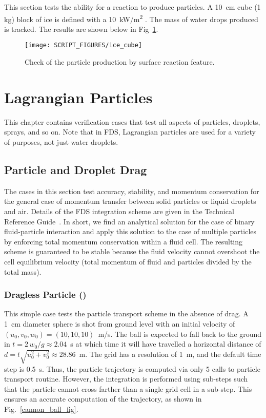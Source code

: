 \documentclass[11pt]{book}
\begin{document}
This section tests the ability for a  reaction to produce particles. A 10~cm cube (1 kg) block of ice is defined with a 10~\si{kW/m^2} . The mass of water drops produced is tracked. The results are shown below in Fig~\ref{fig:ice_cube}.

\begin{figure}[!ht]
    \centering
    \texttt{[image: SCRIPT\_FIGURES/ice\_cube]}
    \caption[Check of the particle production by surface reaction feature (the  case)]{Check of the particle production by surface reaction feature.}
    \label{fig:ice_cube}
\end{figure}



\chapter{Lagrangian Particles}

This chapter contains verification cases that test all aspects of particles, droplets, sprays, and so on. Note that in FDS, Lagrangian particles are used for a variety of purposes, not just water droplets.

\section{Particle and Droplet Drag}

The cases in this section test accuracy, stability, and momentum conservation for the general case of momentum transfer between solid particles or liquid droplets and air. Details of the FDS integration scheme are given in the Technical Reference Guide~\cite{FDS_Tech_Guide}.  In short, we find an analytical solution for the case of binary fluid-particle interaction and apply this solution to the case of multiple particles by enforcing total momentum conservation within a fluid cell.  The resulting scheme is guaranteed to be stable because the fluid velocity cannot overshoot the cell equilibrium velocity (total momentum of fluid and particles divided by the total mass).

\subsection{Dragless Particle (\texorpdfstring{}{cannon\_ball})}
\label{cannon_ball}

This simple case tests the particle transport scheme in the absence of drag. A 1~cm diameter sphere is shot from ground level with an initial velocity of $(u_0,v_0,w_0)=(10,10,10)$~m/s. The ball is expected to fall back to the ground in $t=2\, w_0/g\approx 2.04$~s at which time it will have travelled a horizontal distance of $d=t \sqrt{u_0^2+v_0^2}\approx 28.86$~m. The grid has a resolution of 1~m, and the default time step is 0.5~s. Thus, the particle trajectory is computed via only 5 calls to particle transport routine. However, the integration is performed using sub-steps such that the particle cannot cross farther than a single grid cell in a sub-step. This ensures an accurate computation of the trajectory, as shown in Fig.~\ref{cannon_ball_fig}.
\end{document}
